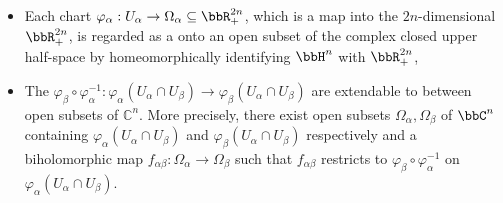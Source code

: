 \begin{definition}
\begin{enumerate}
        \begin{itemize}
            \item Each chart \(\varphi_\alpha : U_\alpha \to \Omega_\alpha \subseteq \bbR^{2n}_+\), which is a map into the $2n$-dimensional  $\bbR^{2n}_+$,  is regarded as a  onto an open subset of the complex closed upper half-space  by homeomorphically identifying $\bbH^n$ with $\bbR^{2n}_+$,
            \item The  \(\varphi_\beta \circ \varphi_\alpha^{-1} : \varphi_\alpha(U_\alpha \cap U_\beta) \to \varphi_\beta(U_\alpha \cap U_\beta)\) are extendable to  between open subsets of \(\mathbb{C}^n\). More precisely, there exist open subsets $\Omega_\alpha, \Omega_\beta$ of $\bbC^n$ containing $\varphi_\alpha(U_\alpha \cap U_\beta)$ and $\varphi_\beta(U_\alpha \cap U_\beta)$ respectively and a biholomorphic map $f_{\alpha\beta}: \Omega_\alpha \to \Omega_\beta$ such that $f_{\alpha\beta}$ restricts to $\varphi_\beta \circ \varphi_\alpha^{-1}$ on  $\varphi_\alpha(U_\alpha \cap U_\beta)$.
        \end{itemize}
        
    \end{enumerate}


\end{definition}